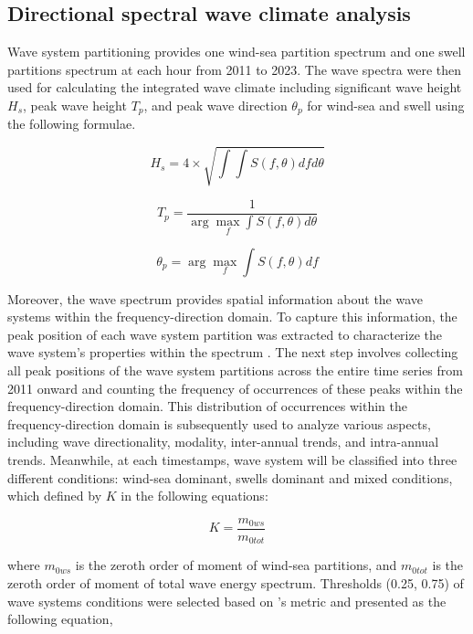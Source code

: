 \subsection{Directional spectral wave climate analysis}
\label{Directional spectral wave climate analysis}

Wave system partitioning provides one wind-sea partition spectrum and one swell
partitions spectrum at each hour from 2011 to 2023. The wave spectra were then
used for calculating the integrated wave climate including significant wave
height $H_s$, peak wave height $T_p$, and peak wave direction $\theta_p$ for
wind-sea and swell using the following formulae.  

\begin{equation}
    H_s=4\times \sqrt{\int \int S(f,\theta)dfd\theta}
\label{eq:eq4.6}
\end{equation}

\begin{equation}
    T_p=\frac{1}{\arg\max_f \int S(f,\theta)d\theta}
\label{eq:eq4.7}
\end{equation}

\begin{equation}
    \theta_p=\arg\max_f \int S(f,\theta)df
\label{eq:eq4.8}
\end{equation}


Moreover, the wave spectrum provides spatial information about the wave systems
within the frequency-direction domain. To capture this information, the peak
position of each wave system partition was extracted to characterize the wave
system’s properties within the spectrum \citep{portilla-yandun_wave_2015}. The
next step involves collecting all peak positions of the wave system partitions
across the entire time series from 2011 onward and counting the frequency of
occurrences of these peaks within the frequency-direction domain. This
distribution of occurrences within the frequency-direction domain is 
subsequently used to analyze various aspects, including wave directionality,
modality, inter-annual trends, and intra-annual trends. Meanwhile, at each timestamps,
wave system will be classified into three different conditions: wind-sea dominant,
swells dominant and mixed conditions, which defined by $K$ in the following equations:

\begin{equation}
K = \frac{m_{0ws}}{m_{0tot}}
\label{eq:eq4.9}
\end{equation}

where $m_{0ws}$ is the zeroth order of moment of wind-sea partitions, and
$m_{0tot}$ is the zeroth order of moment of total wave energy spectrum.
Thresholds (0.25, 0.75) of wave systems conditions were selected based on
\citet{mazzaretto2024worldwide}'s metric and presented as the following
equation,

